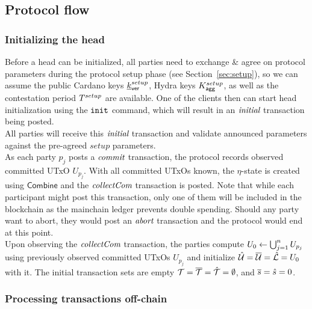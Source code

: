 \subsection{Protocol flow}


\subsubsection{Initializing the head}

\quad Before a head can be initialized, all
parties need to exchange \& agree on protocol parameters during the protocol
setup phase (see Section~\ref{sec:setup}), so we can assume the public Cardano
keys $\underline{k}_{\mathsf{ver}}^{setup}$, Hydra keys $K_{\mathsf{agg}}^{setup}$, as well as the contestation
period $T^{setup}$ are available. One of the clients then can start head initialization using the $\mathtt{init}$ command, which will result in an $\textit{initial}$ transaction being posted.\\

\quad All parties will receive this $\textit{initial}$ transaction and validate announced parameters against the pre-agreed $setup$ parameters.\\

\quad As each party $p_{j}$ posts a
$\textit{commit}$ transaction, the protocol records observed committed UTxO
$U_{p_{j}}$. With all committed UTxOs known, the $\eta$-state is created using
$\mathsf{Combine}$ and the $\textit{collectCom}$ transaction is posted. Note that while
each participant might post this transaction, only one of them will be included
in the blockchain as the mainchain ledger prevents double spending. Should any
party want to abort, they would post an $\textit{abort}$ transaction and the protocol
would end at this point.\\

\quad Upon observing the $\textit{collectCom}$
transaction, the parties compute $U_{0} \gets \bigcup_{j=1}^{n} U_{p_j}$ using
previously observed committed UTxOs $U_{p_j}$ and initialize
$\hat {\mathcal U} = \overline {\mathcal U} = \hat {\mathcal L} = U_{0}$ with it. The initial transaction sets are empty
${\mathcal T} = \overline {\mathcal T} =\hat {\mathcal T} =\emptyset$, and $\overline s = \hat s = 0$.

\subsubsection{Processing transactions off-chain}

